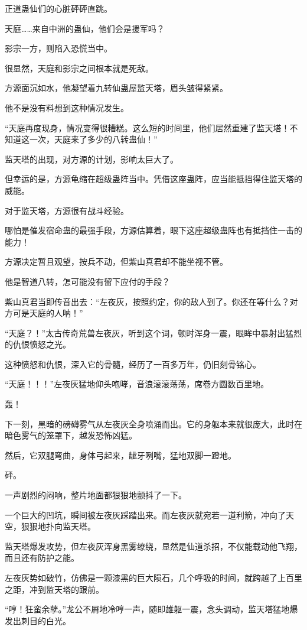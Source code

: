 \begin{this_body}
正道蛊仙们的心脏砰砰直跳。

天庭……来自中洲的蛊仙，他们会是援军吗？

影宗一方，则陷入恐慌当中。

很显然，天庭和影宗之间根本就是死敌。

方源面沉如水，他凝望着九转仙蛊屋监天塔，眉头皱得紧紧。

他不是没有料想到这种情况发生。

“天庭再度现身，情况变得很糟糕。这么短的时间里，他们居然重建了监天塔！不知道这一次，天庭来了多少的八转蛊仙！”

监天塔的出现，对方源的计划，影响太巨大了。

但幸运的是，方源龟缩在超级蛊阵当中。凭借这座蛊阵，应当能抵挡得住监天塔的威能。

对于监天塔，方源很有战斗经验。

哪怕是催发宿命蛊的最强手段，方源估算着，眼下这座超级蛊阵也有抵挡住一击的能力！

方源决定暂且观望，按兵不动，但紫山真君却不能坐视不管。

他是智道八转，怎可能没有留下应付的手段？

紫山真君当即传音出去：“左夜灰，按照约定，你的敌人到了。你还在等什么？对方可是天庭的人呐！”

“天庭？！”太古传奇荒兽左夜灰，听到这个词，顿时浑身一震，眼眸中暴射出猛烈的仇恨愤怒之光。

这种愤怒和仇恨，深入它的骨髓，经历了一百多万年，仍旧刻骨铭心。

“天庭！！！”左夜灰猛地仰头咆哮，音浪滚滚荡荡，席卷方圆数百里地。

轰！

下一刻，黑暗的磅礴雾气从左夜灰全身喷涌而出。它的身躯本来就很庞大，此时在暗色雾气的笼罩下，越发恐怖凶猛。

然后，它双腿弯曲，身体弓起来，龇牙咧嘴，猛地双脚一蹬地。

砰。

一声剧烈的闷响，整片地面都狠狠地颤抖了一下。

一个巨大的凹坑，瞬间被左夜灰踩踏出来。而左夜灰就宛若一道利箭，冲向了天空，狠狠地扑向监天塔。

监天塔爆发攻势，但左夜灰浑身黑雾缭绕，显然是仙道杀招，不仅能载动他飞翔，而且还有防护之能。

左夜灰势如破竹，仿佛是一颗漆黑的巨大陨石，几个呼吸的时间，就跨越了上百里之距，冲到监天塔的跟前。

“哼！狂蛮余孽。”龙公不屑地冷哼一声，随即雄躯一震，念头调动，监天塔猛地爆发出刺目的白光。


\end{this_body}
